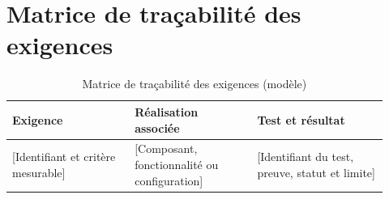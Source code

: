 \chapter{Matrice de traçabilité des exigences}

\begin{table}[htbp]
  \centering
  \caption{Matrice de traçabilité des exigences (modèle)}
  \label{tab:matrice-tracabilite}
  \begin{tabular}{@{}p{0.30\linewidth}p{0.30\linewidth}p{0.32\linewidth}@{}}
    \toprule
    \textbf{Exigence} & \textbf{Réalisation associée} & \textbf{Test et résultat} \\
    \midrule
    {[Identifiant et critère mesurable]} & {[Composant, fonctionnalité ou configuration]} & {[Identifiant du test, preuve, statut et limite]} \\
    \bottomrule
  \end{tabular}
\end{table}
